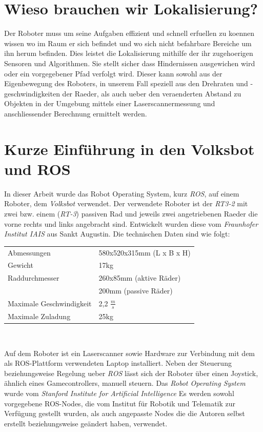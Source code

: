 \documentclass[11pt,a4paper]{article}
\begin{document}
\section{Wieso brauchen wir Lokalisierung?}
Der Roboter muss um seine Aufgaben effizient und schnell erfuellen zu koennen wissen wo im Raum er sich befindet und wo sich nicht befahrbare Bereiche um ihn herum befinden.
Dies leistet die Lokalisierung mithilfe der ihr zugehoerigen Sensoren und Algorithmen. Sie stellt sicher dass Hindernissen ausgewichen wird oder ein vorgegebener Pfad verfolgt wird. 
Dieser kann sowohl aus der Eigenbewegung des Roboters, in unserem Fall speziell aus den Drehraten und -geschwindigkeiten der Raeder, als auch ueber den veraenderten Abstand zu Objekten 
in der Umgebung mittels einer Laserscannermessung und anschliessender Berechnung ermittelt werden. 

\section{Kurze Einführung in den Volksbot und ROS}
In dieser Arbeit wurde das Robot Operating System, kurz \textit{ROS}, auf einem Roboter, dem \textit{Volksbot} verwendet.
Der verwendete Roboter ist der \textit{RT3-2} mit zwei bzw. einem (\textit{RT-3}) passiven Rad und jeweils zwei angetriebenen Raeder die vorne rechts und links angebracht sind.
Entwickelt wurden diese vom \textit{Fraunhofer Institut IAIS} aus Sankt Augustin. 
Die technischen Daten sind wie folgt\footnotemark[4]:\\
\vspace{-5mm}
\begin{center}
\begin{tabular}{| p{5cm} p{5cm} |}
  \hline
  Abmessungen & 580x520x315mm (L x B x H) \\
  Gewicht & 17kg \\
  
  Raddurchmesser & 260x85mm (aktive Räder) \\
   & 200mm (passive Räder) \\
  Maximale Geschwindigkeit & 2,2 $\frac{m}{s}$ \\
  
  Maximale Zuladung & 25kg \\
  \hline
\end{tabular} \\
\end{center}
Auf dem Roboter ist ein Laserscanner sowie Hardware zur Verbindung mit dem als ROS-Plattform verwendeten
Laptop installiert. Neben der Steuerung beziehungsweise Regelung ueber \textit{ROS} lässt sich der Roboter über einen Joystick, ähnlich eines Gamecontrollers, manuell steuern.
Das \textit{Robot Operating System} wurde vom \textit{Stanford Institute for Artificial Intelligence} 
Es werden sowohl vorgegebene ROS-Nodes, die vom Institut für Robotik und Telematik zur Verfügung gestellt wurden, als auch angepasste Nodes die die Autoren selbst erstellt beziehungsweise
geändert haben, verwendet. 
\end{document}
